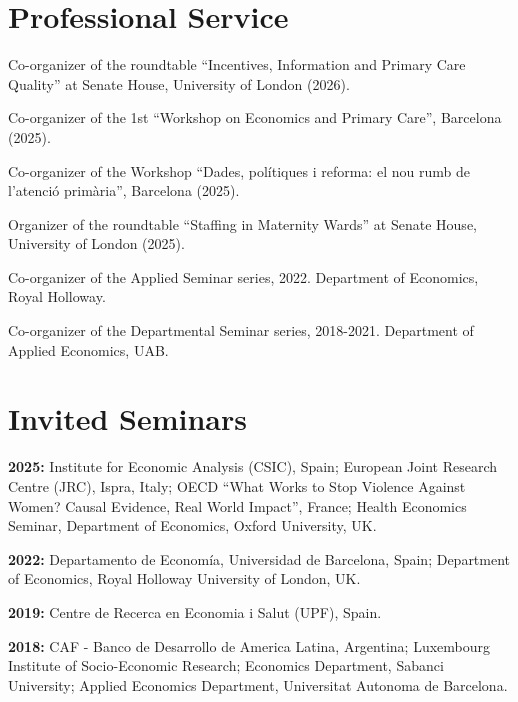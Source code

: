 \documentclass[letterpaper]{article}
\renewenvironment{itemize}{
  \begin{list}{}{
    \setlength{\leftmargin}{1.5em}
  }
}{
  \end{list}
}
\newcommand{\cvbullet}[1]{\item #1}
\newcommand{\cvyear}[2]{\item {\bf #1:} #2}
\begin{document}
\section*{Professional Service}
\begin{itemize}
	\cvbullet{Co-organizer of the roundtable ``Incentives, Information and Primary Care Quality'' at Senate House, University of London (2026).}
	\cvbullet{Co-organizer of the 1st ``Workshop on Economics and Primary Care'', Barcelona (2025).}
	\cvbullet{Co-organizer of the Workshop ``Dades, pol\'{i}tiques i reforma: el nou rumb de l'atenci\'{o} prim\`{a}ria'', Barcelona (2025).}
	\cvbullet{Organizer of the roundtable ``Staffing in Maternity Wards'' at Senate House, University of London (2025).}
	\cvbullet{Co-organizer of the Applied Seminar series, 2022. Department of Economics, Royal Holloway.}
	\cvbullet{Co-organizer of the Departmental Seminar series, 2018-2021. Department of Applied Economics, UAB.}
\end{itemize}

\section*{Invited Seminars}
\begin{itemize}
	\cvyear{2025}{Institute for Economic Analysis (CSIC), Spain; European Joint Research Centre (JRC), Ispra, Italy; OECD ``What Works to Stop Violence Against Women? Causal Evidence, Real World Impact'', France; Health Economics Seminar, Department of Economics, Oxford University, UK.}
	\cvyear{2022}{Departamento de Econom\'{i}a, Universidad de Barcelona, Spain; Department of Economics, Royal Holloway University of London, UK.}
	\cvyear{2019}{Centre de Recerca en Economia i Salut (UPF), Spain.}
	\cvyear{2018}{CAF - Banco de Desarrollo de America Latina, Argentina; Luxembourg Institute of Socio-Economic Research; Economics Department, Sabanci University; Applied Economics Department, Universitat Autonoma de Barcelona.}
\end{itemize}
\end{document}
